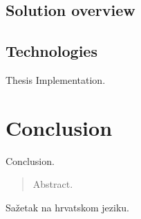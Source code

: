 \documentclass[times, utf8, diplomski, english]{fer}
\begin{document}
\section{Solution overview}

\section{Technologies}


Thesis Implementation.

\chapter{Conclusion}
Conclusion.






\begin{abstract}
Abstract.

\end{abstract}

\begin{sazetak}
Sažetak na hrvatskom jeziku.

\end{sazetak}
\end{document}

